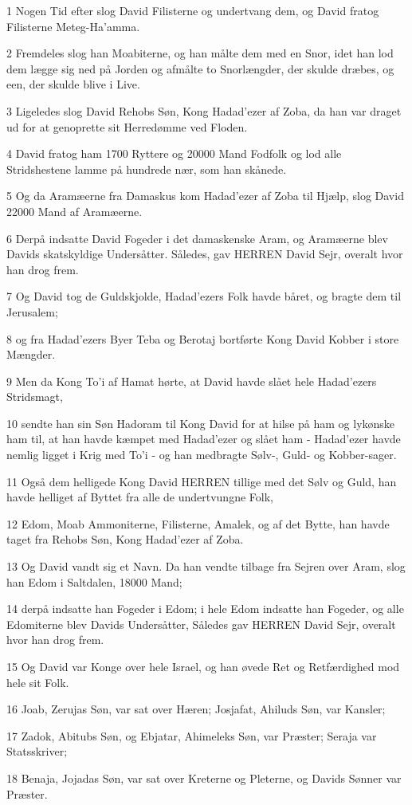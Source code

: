 \par 1 Nogen Tid efter slog David Filisterne og undertvang dem, og David fratog Filisterne Meteg-Ha'amma.
\par 2 Fremdeles slog han Moabiterne, og han målte dem med en Snor, idet han lod dem lægge sig ned på Jorden og afmålte to Snorlængder, der skulde dræbes, og een, der skulde blive i Live.
\par 3 Ligeledes slog David Rehobs Søn, Kong Hadad'ezer af Zoba, da han var draget ud for at genoprette sit Herredømme ved Floden.
\par 4 David fratog ham 1700 Ryttere og 20000 Mand Fodfolk og lod alle Stridshestene lamme på hundrede nær, som han skånede.
\par 5 Og da Aramæerne fra Damaskus kom Hadad'ezer af Zoba til Hjælp, slog David 22000 Mand af Aramæerne.
\par 6 Derpå indsatte David Fogeder i det damaskenske Aram, og Aramæerne blev Davids skatskyldige Undersåtter. Således, gav HERREN David Sejr, overalt hvor han drog frem.
\par 7 Og David tog de Guldskjolde, Hadad'ezers Folk havde båret, og bragte dem til Jerusalem;
\par 8 og fra Hadad'ezers Byer Teba og Berotaj bortførte Kong David Kobber i store Mængder.
\par 9 Men da Kong To'i af Hamat hørte, at David havde slået hele Hadad'ezers Stridsmagt,
\par 10 sendte han sin Søn Hadoram til Kong David for at hilse på ham og lykønske ham til, at han havde kæmpet med Hadad'ezer og slået ham - Hadad'ezer havde nemlig ligget i Krig med To'i - og han medbragte Sølv-, Guld- og Kobber-sager.
\par 11 Også dem helligede Kong David HERREN tillige med det Sølv og Guld, han havde helliget af Byttet fra alle de undertvungne Folk,
\par 12 Edom, Moab Ammoniterne, Filisterne, Amalek, og af det Bytte, han havde taget fra Rehobs Søn, Kong Hadad'ezer af Zoba.
\par 13 Og David vandt sig et Navn. Da han vendte tilbage fra Sejren over Aram, slog han Edom i Saltdalen, 18000 Mand;
\par 14 derpå indsatte han Fogeder i Edom; i hele Edom indsatte han Fogeder, og alle Edomiterne blev Davids Undersåtter, Således gav HERREN David Sejr, overalt hvor han drog frem.
\par 15 Og David var Konge over hele Israel, og han øvede Ret og Retfærdighed mod hele sit Folk.
\par 16 Joab, Zerujas Søn, var sat over Hæren; Josjafat, Ahiluds Søn, var Kansler;
\par 17 Zadok, Abitubs Søn, og Ebjatar, Ahimeleks Søn, var Præster; Seraja var Statsskriver;
\par 18 Benaja, Jojadas Søn, var sat over Kreterne og Pleterne, og Davids Sønner var Præster.

